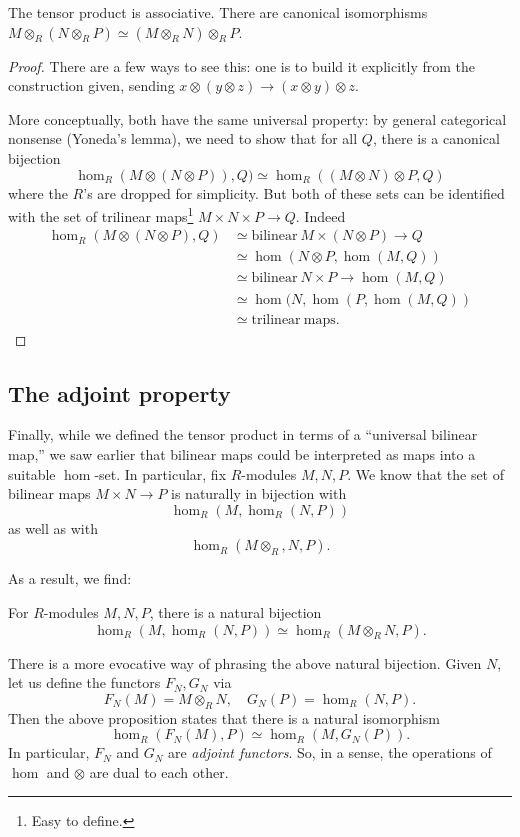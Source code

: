 \begin{proposition}
The tensor product is associative.  There are canonical isomorphisms $M
\otimes_R (N \otimes_R P) \simeq (M
\otimes_R N) \otimes_R P$.
\end{proposition}
\begin{proof}
 There are a few ways to see this: one is to build
it explicitly from the construction given, sending $x \otimes (y \otimes z) \to
(x \otimes y) \otimes z$.

More conceptually, both have the same universal
property: by general categorical nonsense (Yoneda's lemma), we need to show
that for all $Q$, there is  a canonical bijection
\[ \hom_R(M \otimes (N \otimes P)), Q) \simeq \hom_R( (M \otimes N)
\otimes P, Q)  \]
where the $R$'s are dropped for simplicity.  But both of these sets can be
identified with the set of trilinear maps\footnote{Easy to define.} $M \times N
\times P \to Q$. Indeed
\begin{align*}
\hom_R(M \otimes (N \otimes P), Q) & \simeq \mathrm{bilinear} \ M \times (N
\otimes P) \to Q \\
& \simeq \hom(N \otimes P, \hom(M,Q)) \\
& \simeq \mathrm{bilinear} \ N \times P \to \hom(M,Q) \\
& \simeq \hom(N, \hom(P, \hom(M,Q)) \\
& \simeq \mathrm{trilinear\  maps}.
\end{align*}

\end{proof}

\subsection{The adjoint property}
Finally, while we defined the tensor product in terms of a ``universal
bilinear map,'' we saw earlier that bilinear maps could be interpreted as maps
into a suitable $\hom$-set.
In particular, fix $R$-modules $M,N,P$. We know that the set of bilinear maps
$M \times N \to P$ is naturally in bijection with
\[ \hom_R(M, \hom_R(N,P))  \]
as well as with
\[ \hom_R(M \otimes_R, N, P).  \]

As a result, we find:
\begin{proposition} For $R$-modules $M,N,P$, there is a natural bijection
\[ \hom_R(M,\hom_R(N,P)) \simeq \hom_R(M \otimes_R N, P).   \]
\end{proposition}

There is a more evocative way of phrasing the above natural bijection. Given
$N$, let us define the functors $F_N, G_N$ via
\[ F_N(M) = M \otimes_R N, \quad G_N(P) = \hom_R(N,P).  \]
Then the above proposition states that there is a natural isomorphism
\[ \hom_R( F_N(M), P) \simeq \hom_R( M, G_N(P)).  \]
In particular, $F_N$ and $G_N$ are \emph{adjoint functors}. So, in a sense,
the operations of $\hom$ and $\otimes$ are dual to each other.


